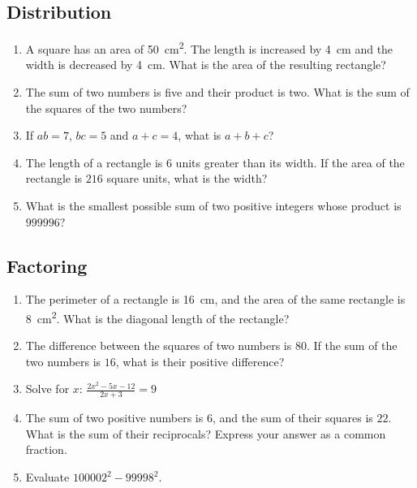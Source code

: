 \documentclass{article}
\begin{document}
    \subsection*{Distribution}
    \begin{enumerate}
        \item A square has an area of \SI{50}{\centi\meter\squared}. The length
        is increased by \SI{4}{\centi\meter} and the width is decreased by
        \SI{4}{\centi\meter}. What is the area of the resulting rectangle?
        \vspace{3cm}
        \item The sum of two numbers is five and their product is two. What is
        the sum of the squares of the two numbers?
        \vspace{3cm}
        \item If $ab = 7$, $bc = 5$ and $a + c = 4$, what is $a + b + c$?
        \vspace{3cm}
        \item The length of a rectangle is $6$ units greater than its width. If
        the area of the rectangle is $216$ square units, what is the width?
        \vspace{3cm}
        \item What is the smallest possible sum of two positive integers whose
        product is $999996$?
        \vspace{3cm}
    \end{enumerate}
    \subsection*{Factoring}
    \begin{enumerate}[resume]
        \item The perimeter of a rectangle is \SI{16}{\centi\meter}, and the
        area of the same rectangle is \SI{8}{\centi\meter\squared}. What is the
        diagonal length of the rectangle?
        \vspace{3cm}
        \item The difference between the squares of two numbers is $80$. If the
        sum of the two numbers is $16$, what is their positive difference?
        \vspace{3cm}
        \item Solve for $x$: $\frac{2x^2 - 5x - 12}{2x + 3} = 9$
        \vspace{3cm}
        \item The sum of two positive numbers is $6$, and the sum of their
        squares is $22$. What is the sum of their reciprocals? Express your
        answer as a common fraction.
        \vspace{3cm}
        \item Evaluate $100002^2 - 99998^2$.
        \vspace{3cm}
    \end{enumerate}
\end{document}
